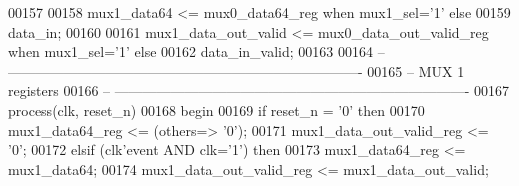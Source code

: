 \begin{DoxyCode}
00157 
00158 \textcolor{vhdlchar}{mux1_data64}                 \textcolor{vhdlchar}{<=} \textcolor{vhdlchar}{mux0_data64_reg}          \textcolor{keywordflow}{when} \textcolor{vhdlchar}{mux1_sel}\textcolor{vhdlchar}{=}\textcolor{vhdlchar}{'}\textcolor{vhdllogic}{}\textcolor{vhdllogic}{1}\textcolor{vhdlchar}{'} \textcolor{keywordflow}{else} 
00159                                     \textcolor{vhdlchar}{data_in};
00160                     
00161 \textcolor{vhdlchar}{mux1_data_out_valid}         \textcolor{vhdlchar}{<=} \textcolor{vhdlchar}{mux0_data_out_valid_reg} \textcolor{keywordflow}{when} \textcolor{vhdlchar}{mux1_sel}\textcolor{vhdlchar}{=}\textcolor{vhdlchar}{'}\textcolor{vhdllogic}{}\textcolor{vhdllogic}{1}\textcolor{vhdlchar}{'} \textcolor{keywordflow}{else} 
00162                                     \textcolor{vhdlchar}{data_in_valid};
00163                                     
00164 \textcolor{keyword}{-- ----------------------------------------------------------------------------}
00165 \textcolor{keyword}{-- MUX 1 registers}
00166 \textcolor{keyword}{-- ----------------------------------------------------------------------------                                 }
00167 \textcolor{keywordflow}{process}(clk, reset_n)
00168 \textcolor{vhdlkeyword}{begin }
00169     \textcolor{keywordflow}{if} \textcolor{vhdlchar}{reset_n} \textcolor{vhdlchar}{=} \textcolor{vhdlchar}{'}\textcolor{vhdllogic}{}\textcolor{vhdllogic}{0}\textcolor{vhdlchar}{'} \textcolor{keywordflow}{then} 
00170         \textcolor{vhdlchar}{mux1_data64_reg}             \textcolor{vhdlchar}{<=} \textcolor{vhdlchar}{(}\textcolor{keywordflow}{others}\textcolor{vhdlchar}{=}\textcolor{vhdlchar}{>} \textcolor{vhdlchar}{'}\textcolor{vhdllogic}{}\textcolor{vhdllogic}{0}\textcolor{vhdlchar}{'}\textcolor{vhdlchar}{)};
00171         \textcolor{vhdlchar}{mux1_data_out_valid_reg} \textcolor{vhdlchar}{<=} \textcolor{vhdlchar}{'}\textcolor{vhdllogic}{}\textcolor{vhdllogic}{0}\textcolor{vhdlchar}{'};
00172     \textcolor{keywordflow}{elsif} \textcolor{vhdlchar}{(}\textcolor{vhdlchar}{clk}\textcolor{vhdlchar}{'}\textcolor{vhdlkeyword}{event} \textcolor{keywordflow}{AND} \textcolor{vhdlchar}{clk}\textcolor{vhdlchar}{=}\textcolor{vhdlchar}{'}\textcolor{vhdllogic}{}\textcolor{vhdllogic}{1}\textcolor{vhdlchar}{'}\textcolor{vhdlchar}{)} \textcolor{keywordflow}{then} 
00173         \textcolor{vhdlchar}{mux1_data64_reg}             \textcolor{vhdlchar}{<=} \textcolor{vhdlchar}{mux1_data64};
00174         \textcolor{vhdlchar}{mux1_data_out_valid_reg} \textcolor{vhdlchar}{<=} \textcolor{vhdlchar}{mux1_data_out_valid};

\end{DoxyCode}

